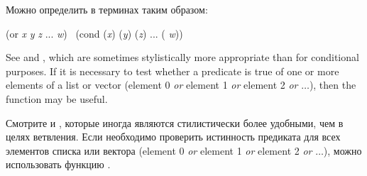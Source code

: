 \begin{defmac}
Можно определить  в терминах  таким образом:
\begin{lisp}
(or \emph{x} \emph{y} \emph{z} ... \emph{w}) \EQ\ (cond (\emph{x}) (\emph{y}) (\emph{z}) ... ({\true} \emph{w}))
\end{lisp}

See  and , which are sometimes
stylistically more appropriate than  for conditional purposes.
If it is necessary to test whether a predicate is true of
one or more elements of a list or vector (element 0 \emph{or} element 1 \emph{or}
element 2 \emph{or} $\ldots$), then the function  may be useful.

Смотрите  и , которые иногда являются стилистически более
удобными, чем  в целях ветвления.
Если необходимо проверить истинность предиката для всех элементов списка или
вектора (element 0 \emph{or} element 1 \emph{or}
element 2 \emph{or} $\ldots$), можно использовать функцию .
\end{defmac}
